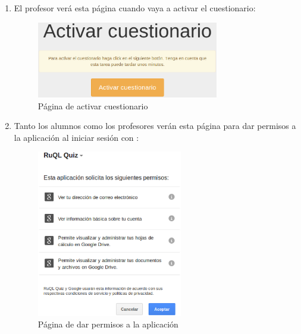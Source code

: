 \begin{enumerate}
  
  \item El profesor ver\'a esta p\'agina cuando vaya a activar el cuestionario:
  \begin{figure}[!th]
  \begin{center}
  \includegraphics[width=0.75\textwidth]{images/app4.eps}
  \caption{P\'agina de activar cuestionario}
  \label{fig:app4}
  \end{center}
  \end{figure}
  \newpage
  
  \item Tanto los alumnos como los profesores ver\'an esta p\'agina para dar permisos a la aplicaci\'on al iniciar sesi\'on con :
  \begin{figure}[!th]
  \begin{center}
  \includegraphics[width=0.6\textwidth]{images/app5.eps}
  \caption{P\'agina de dar permisos a la aplicaci\'on}
  \label{fig:app5}
  \end{center}
  \end{figure}
  

\end{enumerate}
